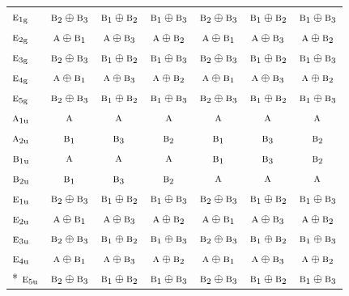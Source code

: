 \documentclass[10pt,a4paper]{article}
\numberwithin{equation}{section}
\newcommand{\irr}[1]{\text{\normalfont\scshape #1}}
\newcommand{\ptag}[1]{\mathrm{#1}}
\begin{document}
{\begin{longtable}{@{}lcccccc@{}}
$\irr{e}_{1\ptag{g}}$ & $\irr{b}_{2}\oplus \irr{b}_{3}$ & $\irr{b}_{1}\oplus \irr{b}_{2}$ & $\irr{b}_{1}\oplus \irr{b}_{3}$ & $\irr{b}_{2}\oplus \irr{b}_{3}$ & $\irr{b}_{1}\oplus \irr{b}_{2}$ & $\irr{b}_{1}\oplus \irr{b}_{3}$\\
$\irr{e}_{2\ptag{g}}$ & $\irr{a}\oplus \irr{b}_{1}$ & $\irr{a}\oplus \irr{b}_{3}$ & $\irr{a}\oplus \irr{b}_{2}$ & $\irr{a}\oplus \irr{b}_{1}$ & $\irr{a}\oplus \irr{b}_{3}$ & $\irr{a}\oplus \irr{b}_{2}$\\
$\irr{e}_{3\ptag{g}}$ & $\irr{b}_{2}\oplus \irr{b}_{3}$ & $\irr{b}_{1}\oplus \irr{b}_{2}$ & $\irr{b}_{1}\oplus \irr{b}_{3}$ & $\irr{b}_{2}\oplus \irr{b}_{3}$ & $\irr{b}_{1}\oplus \irr{b}_{2}$ & $\irr{b}_{1}\oplus \irr{b}_{3}$\\
$\irr{e}_{4\ptag{g}}$ & $\irr{a}\oplus \irr{b}_{1}$ & $\irr{a}\oplus \irr{b}_{3}$ & $\irr{a}\oplus \irr{b}_{2}$ & $\irr{a}\oplus \irr{b}_{1}$ & $\irr{a}\oplus \irr{b}_{3}$ & $\irr{a}\oplus \irr{b}_{2}$\\
$\irr{e}_{5\ptag{g}}$ & $\irr{b}_{2}\oplus \irr{b}_{3}$ & $\irr{b}_{1}\oplus \irr{b}_{2}$ & $\irr{b}_{1}\oplus \irr{b}_{3}$ & $\irr{b}_{2}\oplus \irr{b}_{3}$ & $\irr{b}_{1}\oplus \irr{b}_{2}$ & $\irr{b}_{1}\oplus \irr{b}_{3}$\\
$\irr{a}_{1\ptag{u}}$ & $\irr{a}$ & $\irr{a}$ & $\irr{a}$ & $\irr{a}$ & $\irr{a}$ & $\irr{a}$\\
$\irr{a}_{2\ptag{u}}$ & $\irr{b}_{1}$ & $\irr{b}_{3}$ & $\irr{b}_{2}$ & $\irr{b}_{1}$ & $\irr{b}_{3}$ & $\irr{b}_{2}$\\
$\irr{b}_{1\ptag{u}}$ & $\irr{a}$ & $\irr{a}$ & $\irr{a}$ & $\irr{b}_{1}$ & $\irr{b}_{3}$ & $\irr{b}_{2}$\\
$\irr{b}_{2\ptag{u}}$ & $\irr{b}_{1}$ & $\irr{b}_{3}$ & $\irr{b}_{2}$ & $\irr{a}$ & $\irr{a}$ & $\irr{a}$\\
$\irr{e}_{1\ptag{u}}$ & $\irr{b}_{2}\oplus \irr{b}_{3}$ & $\irr{b}_{1}\oplus \irr{b}_{2}$ & $\irr{b}_{1}\oplus \irr{b}_{3}$ & $\irr{b}_{2}\oplus \irr{b}_{3}$ & $\irr{b}_{1}\oplus \irr{b}_{2}$ & $\irr{b}_{1}\oplus \irr{b}_{3}$\\
$\irr{e}_{2\ptag{u}}$ & $\irr{a}\oplus \irr{b}_{1}$ & $\irr{a}\oplus \irr{b}_{3}$ & $\irr{a}\oplus \irr{b}_{2}$ & $\irr{a}\oplus \irr{b}_{1}$ & $\irr{a}\oplus \irr{b}_{3}$ & $\irr{a}\oplus \irr{b}_{2}$\\
$\irr{e}_{3\ptag{u}}$ & $\irr{b}_{2}\oplus \irr{b}_{3}$ & $\irr{b}_{1}\oplus \irr{b}_{2}$ & $\irr{b}_{1}\oplus \irr{b}_{3}$ & $\irr{b}_{2}\oplus \irr{b}_{3}$ & $\irr{b}_{1}\oplus \irr{b}_{2}$ & $\irr{b}_{1}\oplus \irr{b}_{3}$\\
$\irr{e}_{4\ptag{u}}$ & $\irr{a}\oplus \irr{b}_{1}$ & $\irr{a}\oplus \irr{b}_{3}$ & $\irr{a}\oplus \irr{b}_{2}$ & $\irr{a}\oplus \irr{b}_{1}$ & $\irr{a}\oplus \irr{b}_{3}$ & $\irr{a}\oplus \irr{b}_{2}$\\*
$\irr{e}_{5\ptag{u}}$ & $\irr{b}_{2}\oplus \irr{b}_{3}$ & $\irr{b}_{1}\oplus \irr{b}_{2}$ & $\irr{b}_{1}\oplus \irr{b}_{3}$ & $\irr{b}_{2}\oplus \irr{b}_{3}$ & $\irr{b}_{1}\oplus \irr{b}_{2}$ & $\irr{b}_{1}\oplus \irr{b}_{3}$\\
\bottomrule\end{longtable}}
\end{document}
